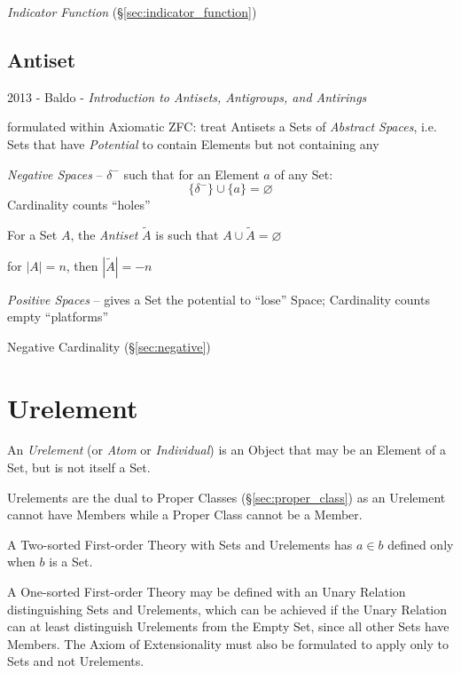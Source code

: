 \emph{Indicator Function} (\S\ref{sec:indicator_function})



\subsection{Antiset}\label{sec:antiset}

2013 - Baldo - \emph{Introduction to Antisets, Antigroups, and Antirings}

formulated within Axiomatic ZFC: treat Antisets a Sets of \emph{Abstract
  Spaces}, i.e. Sets that have \emph{Potential} to contain Elements but not
containing any

\emph{Negative Spaces} -- $\delta^-$ such that for an Element $a$ of any Set:
\[
  \{\delta^-\} \cup \{a\} = \varnothing
\]
Cardinality counts ``holes''

For a Set $A$, the \emph{Antiset} $\tilde{A}$ is such that
$A \cup \tilde{A} = \varnothing$

for $|A|=n$, then $|\tilde{A}| = -n$

\emph{Positive Spaces} -- gives a Set the potential to ``lose'' Space;
Cardinality counts empty ``platforms''

\fist Negative Cardinality (\S\ref{sec:negative})



\section{Urelement}\label{sec:urelement}

An \emph{Urelement} (or \emph{Atom} or \emph{Individual}) is an Object
that may be an Element of a Set, but is not itself a Set.

Urelements are the dual to Proper Classes (\S\ref{sec:proper_class})
as an Urelement cannot have Members while a Proper Class cannot be a
Member.

A Two-sorted First-order Theory with Sets and Urelements has $a \in b$
defined only when $b$ is a Set.

A One-sorted First-order Theory may be defined with an Unary Relation
distinguishing Sets and Urelements, which can be achieved if the Unary
Relation can at least distinguish Urelements from the Empty Set, since
all other Sets have Members. The Axiom of Extensionality must also be
formulated to apply only to Sets and not Urelements.

